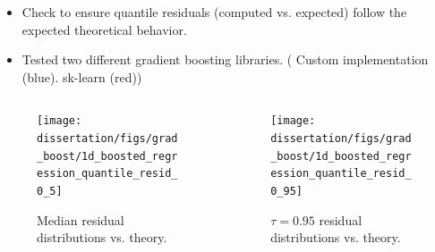 \documentclass[t, pdftex]{beamer}
\begin{document}
\begin{frame}
\vspace{-16pt}
\begin{itemize}
    \item Check to ensure quantile residuals (computed vs. expected) follow the expected theoretical behavior.
    \item Tested two different gradient boosting libraries.  ({\color{blue} Custom implementation  (blue)}. {\color{red} sk-learn (red)})
\end{itemize}
\vspace{-28pt}
\begin{columns}
    \begin{column}{0.5\textwidth}
        \begin{figure}
            \centering
            \texttt{[image: dissertation/figs/grad\_boost/1d\_boosted\_regression\_quantile\_resid\_0\_5]}
            \caption{\centering \scriptsize Median residual distributions vs. theory.}
        \end{figure}
    \end{column}
    \begin{column}{0.5\textwidth}  %
        \begin{figure}
            \centering
            \texttt{[image: dissertation/figs/grad\_boost/1d\_boosted\_regression\_quantile\_resid\_0\_95]}\\
            \caption{\centering \scriptsize $\tau=0.95$ residual distributions vs. theory.}
        \end{figure}
    \end{column}
\end{columns}
\end{frame}

\end{document}

